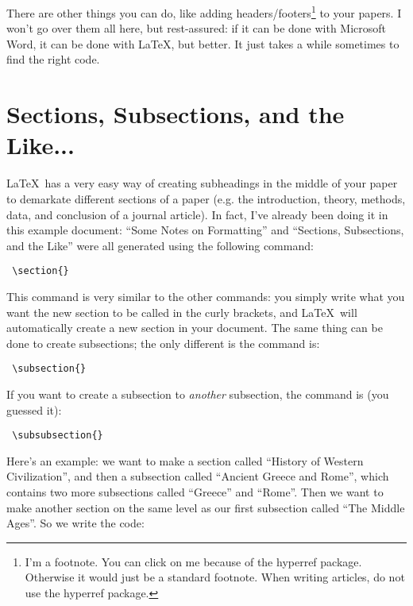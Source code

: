 \documentclass{article}
\begin{document}
There are other things you can do, like adding headers/footers\footnote{I'm a footnote. You can click on me because of the hyperref package. Otherwise it would just be a standard footnote. When writing articles, do not use the hyperref package.} to your papers. I won't go over them all here, but rest-assured: if it can be done with Microsoft Word, it can be done with \LaTeX, but better. It just takes a while sometimes to find the right code. 

\section*{Sections, Subsections, and the Like...}
\LaTeX~has a very easy way of creating subheadings in the middle of your paper to demarkate different sections of a paper (e.g. the introduction, theory, methods, data, and conclusion of a journal article). In fact, I've already been doing it in this example document: ``Some Notes on Formatting'' and ``Sections, Subsections, and the Like'' were all generated using the following command: \begin{verbatim} \section{} \end{verbatim} This command is very similar to the other commands: you simply write what you want the new section to be called in the curly brackets, and \LaTeX~will automatically create a new section in your document. The same thing can be done to create subsections; the only different is the command is: \begin{verbatim} \subsection{} \end{verbatim} If you want to create  a subsection to \textit{another} subsection, the command is (you guessed it): \begin{verbatim} \subsubsection{} \end{verbatim} Here's an example: we want to make a section called ``History of Western Civilization'', and then a subsection called ``Ancient Greece and Rome'', which contains two more subsections called ``Greece'' and ``Rome''. Then we want to make another section on the same level as our first subsection called ``The Middle Ages''. So we write the code:
\end{document}
